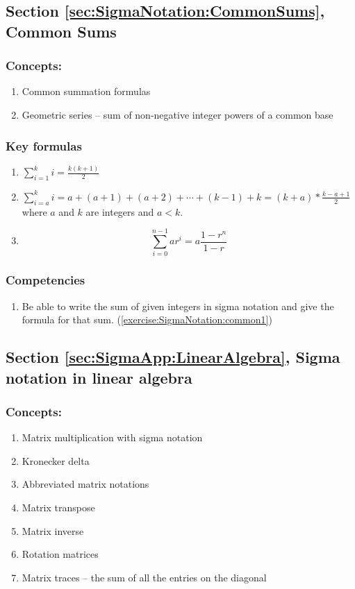 \subsection*{Section \ref{sec:SigmaNotation:CommonSums}, Common Sums}
\subsubsection*{Concepts:}
\begin{enumerate}
\item 
Common summation formulas
\item
Geometric series -- sum of non-negative integer powers of a common base
\end{enumerate}

\subsubsection*{Key formulas}
\begin{enumerate}
\item
$\displaystyle{\sum_{i = 1}^{k}i= \frac{k(k + 1)}{2}}$
\item
$\displaystyle{\sum_{i = a}^{k}i} = a + (a + 1) + (a + 2) + \cdots + (k - 1) + k = (k + a) * \frac{k - a + 1}{2}$ where $a$ and $k$ are integers and $a<k$.
\item
\[ \sum_{i=0}^{n-1} ar^i = a \dfrac{1-r^n}{1-r} \]

\end{enumerate}

\subsubsection*{Competencies}
\begin{enumerate}
\item
Be able to write the sum of given integers in sigma notation and give the formula for that sum. (\ref{exercise:SigmaNotation:common1})
\end{enumerate}


\subsection*{Section \ref{sec:SigmaApp:LinearAlgebra}, Sigma notation in linear algebra}
\subsubsection*{Concepts:}
\begin{enumerate}
\item 
Matrix multiplication with sigma notation
\item
Kronecker delta
\item
Abbreviated matrix notations
\item
Matrix transpose
\item
Matrix inverse
\item
Rotation matrices
\item
Matrix traces -- the sum of all the entries on the diagonal
\end{enumerate}

